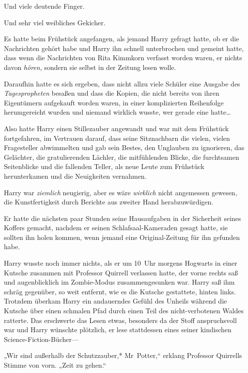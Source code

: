 {Und viele deutende Finger.

Und sehr viel weibliches Gekicher.

Es hatte beim Frühstück angefangen, als jemand Harry gefragt hatte, ob er die Nachrichten gehört habe und Harry ihn schnell unterbrochen und gemeint hatte, dass wenn die Nachrichten von Rita Kimmkorn verfasst worden waren, er nichts davon \emph{hören}, sondern sie selbst in der Zeitung lesen wolle.

Daraufhin hatte es sich ergeben, dass nicht allzu viele Schüler eine Ausgabe des \emph{Tagespropheten} besaßen und dass die Kopien, die nicht bereits von ihren Eigentümern aufgekauft worden waren, in einer komplizierten Reihenfolge herumgereicht wurden und niemand wirklich wusste, wer gerade eine hatte…

Also hatte Harry einen Stillezauber angewandt und war mit dem Frühstück fortgefahren, im Vertrauen darauf, dass seine Sitznachbarn die vielen, vielen Fragesteller abwimmelten und gab sein Bestes, den Unglauben zu ignorieren, das Gelächter, die gratulierenden Lächler, die mitfühlenden Blicke, die furchtsamen Seitenblicke und die fallenden Teller, als neue Leute zum Frühstück herunterkamen und die Neuigkeiten vernahmen.

Harry war \emph{ziemlich} neugierig, aber es wäre \emph{wirklich} nicht angemessen gewesen, die Kunstfertigkeit durch Berichte aus zweiter Hand herabzuwürdigen.

Er hatte die nächsten paar Stunden seine Hausaufgaben in der Sicherheit seines Koffers gemacht, nachdem er seinen Schlafsaal-Kameraden gesagt hatte, sie sollten ihn holen kommen, wenn jemand eine Original-Zeitung für ihn gefunden habe.

Harry wusste noch immer nichts, als er um 10~Uhr morgens Hogwarts in einer Kutsche zusammen mit Professor Quirrell verlassen hatte, der vorne rechts saß und augenblicklich im Zombie-Modus zusammengesunken war. Harry saß ihm schräg gegenüber, so weit entfernt, wie es die Kutsche gestattete, hinten links. Trotzdem überkam Harry ein andauerndes Gefühl des Unheils während die Kutsche über einen schmalen Pfad durch einen Teil des nicht-verbotenen Waldes ratterte. Das erschwerte das Lesen etwas, besonders da der Stoff anspruchsvoll war und Harry wünschte plötzlich, er lese stattdessen eines seiner kindischen Science-Fiction-Bücher—

„Wir sind außerhalb der Schutzzauber,* Mr~Potter,“ erklang Professor Quirrells Stimme von vorn. „Zeit zu gehen.“

}
